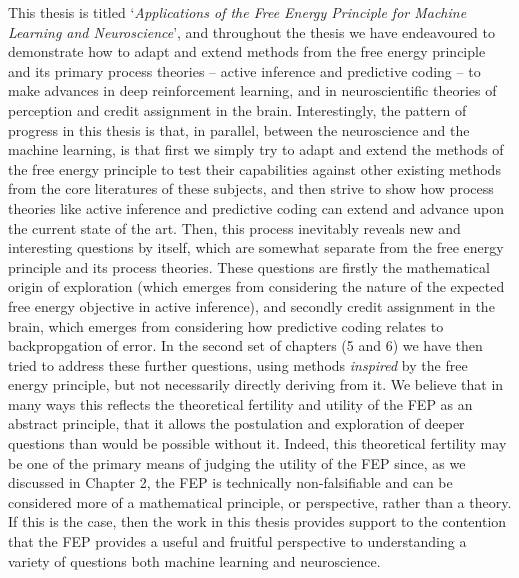 This thesis is titled `\emph{Applications of the Free Energy Principle for Machine Learning and Neuroscience}', and throughout the thesis we have endeavoured to demonstrate how to adapt and extend methods from the free energy principle and its primary process theories -- active inference and predictive coding -- to make advances in deep reinforcement learning, and in neuroscientific theories of perception and credit assignment in the brain. Interestingly, the pattern of progress in this thesis is that, in parallel, between the neuroscience and the machine learning, is that first we simply try to adapt and extend the methods of the free energy principle to test their capabilities against other existing methods from the core literatures of these subjects, and then strive to show how process theories like active inference and predictive coding can extend and advance upon the current state of the art. Then, this process inevitably reveals new and interesting questions by itself, which are somewhat separate from the free energy principle and its process theories. These questions are firstly the mathematical origin of exploration (which emerges from considering the nature of the expected free energy objective in active inference), and secondly credit assignment in the brain, which emerges from considering how predictive coding relates to backpropgation of error. In the second set of chapters (5 and 6) we have then tried to address these further questions, using methods \emph{inspired} by the free energy principle, but not necessarily directly deriving from it. We believe that in many ways this reflects the theoretical fertility and utility of the FEP as an abstract principle, that it allows the postulation and exploration of deeper questions than would be possible without it. Indeed, this theoretical fertility may be one of the primary means of judging the utility of the FEP since, as we discussed in Chapter 2, the FEP is technically non-falsifiable and can be considered more of a mathematical principle, or perspective, rather than a theory. If this is the case, then the work in this thesis provides support to the contention that the FEP provides a useful and fruitful perspective to understanding a variety of questions both machine learning and neuroscience.

